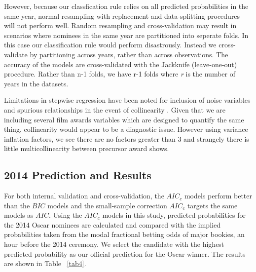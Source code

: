 \documentclass[jou,apacite]{apa6}
\begin{document}
However, because our classfication rule relies on all predicted probabilities in the same year, normal resampling with replacement and data-splitting procedures will not perform well. Random resampling and cross-validation may result in scenarios where nominees in the same year are partitioned into seperate folds. In this case our classification rule would perform disastrously. Instead we cross-validate by partitioning across years, rather than across observations. The accuracy of the models are cross-validated with the Jackknife (leave-one-out) procedure. Rather than n-1 folds, we have r-1 folds where \emph{r} is the number of years in the datasets.

Limitations in stepwise regression have been noted for inclusion of noise variables and spurious relationships in the event of collinearity \cite{harell03}. Given that we are including several film awards variables which are designed to quantify the same thing, collinearity would appear to be a diagnostic issue. However using variance inflation factors, we see there are no factors greater than 3 and strangely there is little multicollinearity between precursor award shows.

\subsection{2014 Prediction and Results}
For both internal validation and cross-validation, the $AIC_c$ models perform better than the $BIC$ models and the small-sample correction $AIC_c$ targets the same models as $AIC$. Using the $AIC_c$ models in this study, predicted probabilities for the 2014 Oscar nominees are calculated and compared with the implied probabilities taken from the modal fractional betting odds of major bookies, an hour before the 2014 ceremony. We select the candidate with the highest predicted probability as our official prediction for the Oscar winner. The results are shown in Table ~\ref{tab4}.
\end{document}
